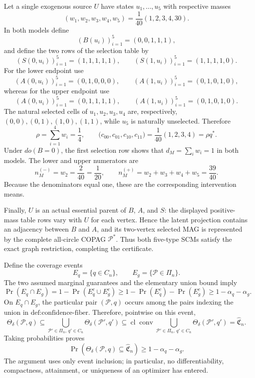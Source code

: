Let a single exogenous source \(U\) have states \(u_1,\ldots,u_5\) with respective masses
\[
(w_1,w_2,w_3,w_4,w_5)=\frac1{40}(1,2,3,4,30).
\]
In both models define
\[
(B(u_i))_{i=1}^5=(0,0,1,1,1),
\]
and define the two rows of the selection table by
\[
(S(0,u_i))_{i=1}^5=(1,1,1,1,1),
\qquad
(S(1,u_i))_{i=1}^5=(1,1,1,1,0).
\]
For the lower endpoint use
\[
(A(0,u_i))_{i=1}^5=(0,1,0,0,0),
\qquad
(A(1,u_i))_{i=1}^5=(0,1,0,1,0),
\]
whereas for the upper endpoint use
\[
(A(0,u_i))_{i=1}^5=(0,1,1,1,1),
\qquad
(A(1,u_i))_{i=1}^5=(0,1,0,1,0).
\]
The natural selected cells of \(u_1,u_2,u_3,u_4\) are, respectively, \((0,0),(0,1),(1,0),(1,1)\), while \(u_5\) is naturally unselected.  Therefore
\[
\rho=\sum_{i=1}^4w_i=\frac14,
\qquad
\bigl(c_{00},c_{01},c_{10},c_{11}\bigr)=\frac1{40}(1,2,3,4)=\rho q^*.
\]
Under \(do(B=0)\), the first selection row shows that \(d_M=\sum_iw_i=1\) in both models.  The lower and upper numerators are
\[
n_M^{(-)}=w_2=\frac2{40}=\frac1{20},
\qquad
n_M^{(+)}=w_2+w_3+w_4+w_5=\frac{39}{40}.
\]
Because the denominators equal one, these are the corresponding intervention means.

Finally, \(U\) is an actual essential parent of \(B\), \(A\), and \(S\): the displayed positive-mass table rows vary with \(U\) for each vertex.  Hence the latent projection contains an adjacency between \(B\) and \(A\), and its two-vertex selected MAG is represented by the complete all-circle COPAG \(\mathcal P^*\).  Thus both five-type SCMs satisfy the exact graph restriction, completing the certificate.

Define the coverage events
\[
E_q=\{q\in C_n\},\qquad E_g=\{\mathcal P\in\Pi_n\}.
\]
The two assumed marginal guarantees and the elementary union bound imply
\[
\Pr(E_q\cap E_g)
=1-\Pr(E_q^c\cup E_g^c)
\geq1-\Pr(E_q^c)-\Pr(E_g^c)
\geq1-\alpha_q-\alpha_g.
\]
On \(E_q\cap E_g\), the particular pair \((\mathcal P,q)\) occurs among the pairs indexing the union in \(\text{def:confidence-fiber}\).  Therefore, pointwise on this event,
\[
\Theta_\delta(\mathcal P,q)
\subseteq
\bigcup_{\mathcal P'\in\Pi_n,\,q'\in C_n}
\Theta_\delta(\mathcal P',q')
\subseteq
\operatorname{cl}\operatorname{conv}
\bigcup_{\mathcal P'\in\Pi_n,\,q'\in C_n}
\Theta_\delta(\mathcal P',q')
=\widehat{\mathfrak C}_n.
\]
Taking probabilities proves
\[
\Pr\!\left(\Theta_\delta(\mathcal P,q)\subseteq\widehat{\mathfrak C}_n\right)
\geq1-\alpha_q-\alpha_g.
\]
The argument uses only event inclusion; in particular, no differentiability, compactness, attainment, or uniqueness of an optimizer has entered.

